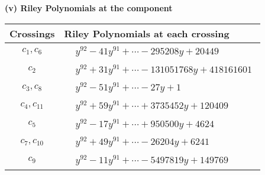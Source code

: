 \documentclass[1p]{elsarticle_modified}
\theoremstyle{definition}
\begin{document}
\flushleft \textbf{(v) Riley Polynomials at the component}\newline \\
\begin{tabular}{m{50pt}|m{274pt}}
Crossings & \hspace{64pt}Riley Polynomials at each crossing \\
\hline $$\begin{aligned}c_{1},c_{6}\end{aligned}$$&$\begin{aligned}
&y^{92}-41 y^{91}+\cdots-295208 y+20449
\end{aligned}$\\
\hline $$\begin{aligned}c_{2}\end{aligned}$$&$\begin{aligned}
&y^{92}+31 y^{91}+\cdots-131051768 y+418161601
\end{aligned}$\\
\hline $$\begin{aligned}c_{3},c_{8}\end{aligned}$$&$\begin{aligned}
&y^{92}-51 y^{91}+\cdots-27 y+1
\end{aligned}$\\
\hline $$\begin{aligned}c_{4},c_{11}\end{aligned}$$&$\begin{aligned}
&y^{92}+59 y^{91}+\cdots+3735452 y+120409
\end{aligned}$\\
\hline $$\begin{aligned}c_{5}\end{aligned}$$&$\begin{aligned}
&y^{92}-17 y^{91}+\cdots+950500 y+4624
\end{aligned}$\\
\hline $$\begin{aligned}c_{7},c_{10}\end{aligned}$$&$\begin{aligned}
&y^{92}+49 y^{91}+\cdots-26204 y+6241
\end{aligned}$\\
\hline $$\begin{aligned}c_{9}\end{aligned}$$&$\begin{aligned}
&y^{92}-11 y^{91}+\cdots-5497819 y+149769
\end{aligned}$\\
\hline
\end{tabular}\\~\\
\end{document}
